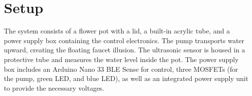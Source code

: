 %
%
%

\section{Setup}
The system consists of a flower pot with a lid, a built-in acrylic tube, and a power supply box containing the control electronics. The pump transports water upward, creating the floating faucet illusion. The ultrasonic sensor is housed in a protective tube and measures the water level inside the pot. The power supply box includes an Arduino Nano 33 BLE Sense for control, three MOSFETs (for the pump, green LED, and blue LED), as well as an integrated power supply unit to provide the necessary voltages.

